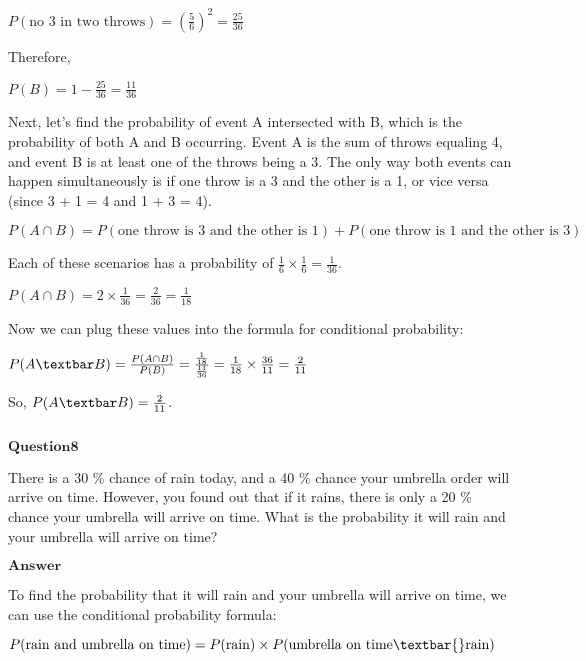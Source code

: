 \documentclass[11pt]{article}
\makeatletter
\newcommand{\boxspacing}{\kern\kvtcb@left@rule\kern\kvtcb@boxsep}
\newcommand{\prompt}[4]{
        {\ttfamily\llap{{\color{#2}[#3]:\hspace{3pt}#4}}\vspace{-\baselineskip}}
    }
\makeatother
\begin{document}
$ P(\text{no 3 in two throws}) = \left(\frac{5}{6}\right)^2 =
\frac{25}{36} $

Therefore,

$ P(B) = 1 - \frac{25}{36} = \frac{11}{36} $

Next, let's find the probability of event A intersected with B, which is
the probability of both A and B occurring. Event A is the sum of throws
equaling 4, and event B is at least one of the throws being a 3. The
only way both events can happen simultaneously is if one throw is a 3
and the other is a 1, or vice versa (since 3 + 1 = 4 and 1 + 3 = 4).

$ P(A \cap B) = P(\text{one throw is 3 and the other is 1}) +
P(\text{one throw is 1 and the other is 3}) $

Each of these scenarios has a probability of $ \frac{1}{6}
\times \frac{1}{6} = \frac{1}{36} $.

$ P(A \cap B) = 2 \times \frac{1}{36} = \frac{2}{36} = \frac{1}{18} $

Now we can plug these values into the formula for conditional
probability:

$ P(A\textbar B) = \frac{P(A \cap B)}{P(B)} =
\frac{\frac{1}{18}}{\frac{11}{36}} = \frac{1}{18} \times \frac{36}{11} =
\frac{2}{11} $

So, $ P(A\textbar B) = \frac{2}{11} $.

    \begin{tcolorbox}[breakable, size=fbox, boxrule=1pt, pad at break*=1mm,colback=cellbackground, colframe=cellborder]
\prompt{In}{incolor}{ }{\boxspacing}
\begin{Verbatim}[commandchars=\\\{\}]

\end{Verbatim}
\end{tcolorbox}

    $\textbf{Question8}$

There is a 30 \% chance of rain today, and a 40 \% chance your umbrella
order will arrive on time. However, you found out that if it rains,
there is only a 20 \% chance your umbrella will arrive on time. What is
the probability it will rain and your umbrella will arrive on time?

$\textbf{Answer}$

    To find the probability that it will rain and your umbrella will arrive
on time, we can use the conditional probability formula:

$ P(\text{rain and umbrella on time}) = P(\text{rain})
\times P(\text{umbrella on time}\textbar{}\text{rain}) $
\end{document}
